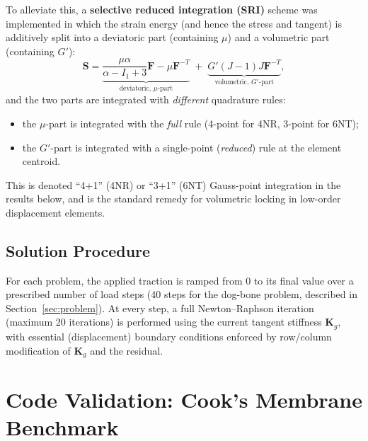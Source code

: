 \documentclass[11pt,a4paper]{article}
\newcommand{\bF}{\mathbf{F}}
\newcommand{\bS}{\mathbf{S}}
\begin{document}
To alleviate this, a \textbf{selective reduced integration (SRI)} scheme was implemented in which the
strain energy (and hence the stress and tangent) is additively split into a deviatoric part (containing
$\mu$) and a volumetric part (containing $G'$):
\begin{equation}
\bS = \underbrace{\frac{\mu\alpha}{\alpha-I_1+3}\bF - \mu\bF^{-T}}_{\text{deviatoric, }\mu\text{-part}}
\;+\; \underbrace{G'(J-1)J\bF^{-T}}_{\text{volumetric, } G'\text{-part}},
\end{equation}
and the two parts are integrated with \emph{different} quadrature rules:
\begin{itemize}
    \item the $\mu$-part is integrated with the \emph{full} rule (4-point for 4NR, 3-point for 6NT);
    \item the $G'$-part is integrated with a single-point (\emph{reduced}) rule at the element centroid.
\end{itemize}
This is denoted ``4+1'' (4NR) or ``3+1'' (6NT) Gauss-point integration in the results below, and is the
standard remedy for volumetric locking in low-order displacement elements.

\subsection{Solution Procedure}
For each problem, the applied traction is ramped from $0$ to its final value over a prescribed number of
load steps (40 steps for the dog-bone problem, described in Section~\ref{sec:problem}). At every step, a
full Newton--Raphson iteration (maximum 20 iterations) is performed using the current tangent stiffness
$\mathbf{K}_g$, with essential (displacement) boundary conditions enforced by row/column
modification of $\mathbf{K}_g$ and the residual.

\section{Code Validation: Cook's Membrane Benchmark}
\label{sec:validation}
\end{document}
